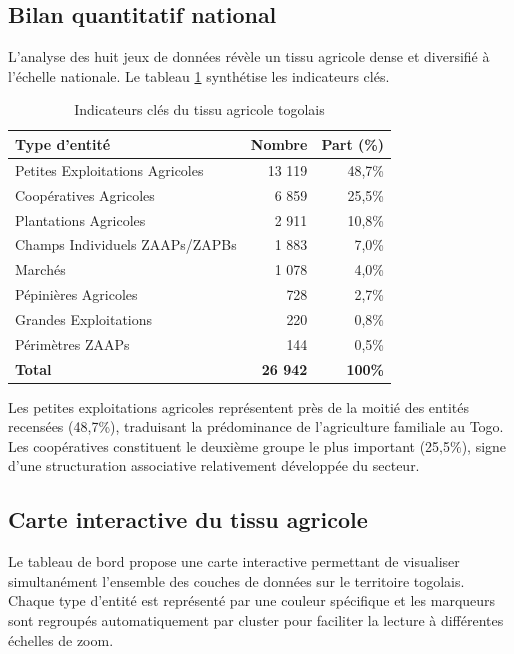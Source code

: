 \documentclass[12pt, a4paper]{article}
\begin{document}
\subsection{Bilan quantitatif national}

L'analyse des huit jeux de données révèle un tissu agricole dense et diversifié à l'échelle nationale.
Le tableau \ref{tab:kpis} synthétise les indicateurs clés.

\begin{table}[H]
\centering
\caption{Indicateurs clés du tissu agricole togolais}
\label{tab:kpis}
\renewcommand{\arraystretch}{1.4}
\begin{tabular}{lrr}
\toprule
\textbf{Type d'entité} & \textbf{Nombre} & \textbf{Part (\%)} \\
\midrule
Petites Exploitations Agricoles & 13 119 & 48,7\% \\
Coopératives Agricoles & 6 859 & 25,5\% \\
Plantations Agricoles & 2 911 & 10,8\% \\
Champs Individuels ZAAPs/ZAPBs & 1 883 & 7,0\% \\
Marchés & 1 078 & 4,0\% \\
Pépinières Agricoles & 728 & 2,7\% \\
Grandes Exploitations & 220 & 0,8\% \\
Périmètres ZAAPs & 144 & 0,5\% \\
\midrule
\textbf{Total} & \textbf{26 942} & \textbf{100\%} \\
\bottomrule
\end{tabular}
\end{table}

Les petites exploitations agricoles représentent près de la moitié des entités recensées (48,7\%),
traduisant la prédominance de l'agriculture familiale au Togo. Les coopératives constituent le deuxième
groupe le plus important (25,5\%), signe d'une structuration associative relativement développée du secteur.

\subsection{Carte interactive du tissu agricole}

Le tableau de bord propose une carte interactive permettant de visualiser simultanément l'ensemble des
couches de données sur le territoire togolais. Chaque type d'entité est représenté par une couleur
spécifique et les marqueurs sont regroupés automatiquement par cluster pour faciliter la lecture à
différentes échelles de zoom.
\end{document}
